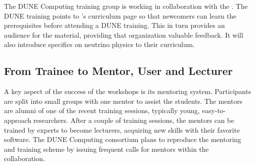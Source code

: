 \documentclass[../main-v1.tex]{subfiles}
\begin{document}
The DUNE Computing training group is working in collaboration with the . The DUNE training %
points to 's curriculum page so that %
newcomers can learn the prerequisites before attending a %
DUNE training. This %
in turn provides an audience for the  material, %
providing that organization valuable feedback. %
It will also introduce specifics on neutrino physics to their curriculum.

\subsection{From Trainee to Mentor, User and Lecturer}
A key aspect of the success of the  workshops %
is its mentoring system. Participants are split into small groups with one mentor to assist the students. The mentors are %
alumni of %
one of the recent training sessions, typically young, easy-to-approach researchers. %
After a couple of training sessions, the mentors can be trained by experts to become lecturers, acquiring new skills with their favorite software. The DUNE Computing consortium plans to reproduce the  mentoring and training scheme %
by issuing frequent calls for mentors within the collaboration.
\end{document}
